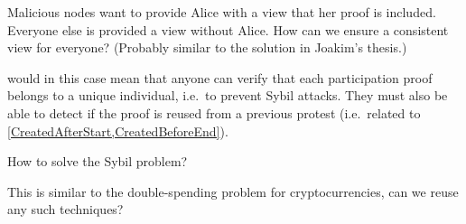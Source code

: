\begin{frame}

  \pause

  \begin{question}
    Malicious nodes want to provide Alice with a view that her proof is 
    included.
    Everyone else is provided a view without Alice.
    How can we ensure a consistent view for everyone?
    (Probably similar to the solution in Joakim's thesis.)
  \end{question}
\end{frame}

 would in this case mean that anyone can verify that 
each participation proof belongs to a unique individual, i.e.\ to prevent Sybil 
attacks.
They must also be able to detect if the proof is reused from a previous protest 
(i.e.\ related to \cref{CreatedAfterStart,CreatedBeforeEnd}).

\begin{frame}

  \pause

  \begin{question}
    How to solve the Sybil problem?
  \end{question}
  \begin{question}
    This is similar to the double-spending problem for cryptocurrencies, can 
    we reuse any such techniques?
  \end{question}
\end{frame}

